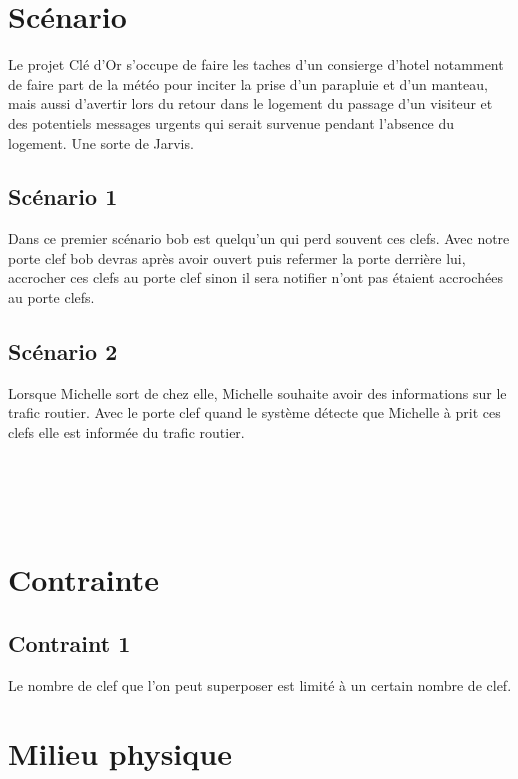 \documentclass[12pt]{article}
\begin{document}
\maketitle
\section{Scénario}
Le projet Clé d'Or s'occupe de faire les taches d'un consierge d'hotel notamment de faire part de la météo pour inciter la prise d'un parapluie et d'un manteau, mais aussi d'avertir lors du retour dans le logement du passage d'un visiteur et des potentiels messages urgents qui serait survenue pendant l'absence du logement. Une sorte de Jarvis.

\subsection{Scénario 1}

Dans ce premier scénario bob est quelqu'un qui perd souvent ces clefs. Avec notre porte clef bob devras après avoir ouvert puis refermer la porte derrière lui, accrocher ces clefs au porte clef sinon il sera notifier n'ont pas étaient accrochées au porte clefs.

\subsection{Scénario 2}

Lorsque Michelle sort de chez elle, Michelle souhaite avoir des informations sur le trafic routier. Avec le porte clef quand le système détecte que Michelle à prit ces clefs elle est informée du trafic routier.\\\\\\\\\\

\section{Contrainte}

\subsection{Contraint 1}
Le nombre de clef que l'on peut superposer est limité à un certain nombre de clef.

\section{Milieu physique}
\end{document}
